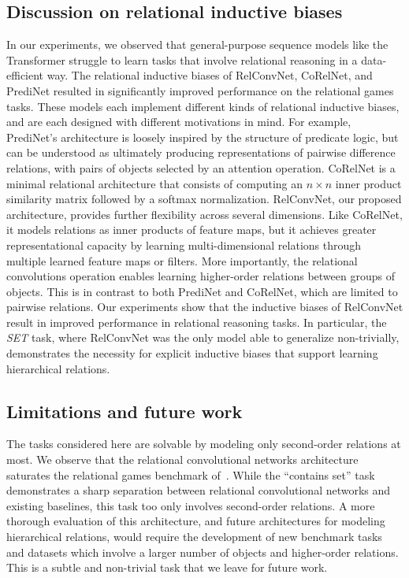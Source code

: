 \subsection*{Discussion on relational inductive biases}
In our experiments, we observed that general-purpose sequence models like the Transformer struggle to learn tasks that involve relational reasoning in a data-efficient way. The relational inductive biases of RelConvNet, CoRelNet, and PrediNet resulted in significantly improved performance on the relational games tasks. These models each implement different kinds of relational inductive biases, and are each designed with different motivations in mind. For example, PrediNet's architecture is loosely inspired by the structure of predicate logic, but can be understood as ultimately producing representations of pairwise difference relations, with pairs of objects selected by an attention operation. CoRelNet is a minimal relational architecture that consists of computing an $n \times n$ inner product similarity matrix followed by a softmax normalization. RelConvNet, our proposed architecture, provides further flexibility across several dimensions. Like CoRelNet, it models relations as inner products of feature maps, but it achieves greater representational capacity by learning multi-dimensional relations through multiple learned feature maps or filters. More importantly, the relational convolutions operation enables learning higher-order relations between groups of objects. This is in contrast to both PrediNet and CoRelNet, which are limited to pairwise relations. Our experiments show that the inductive biases of RelConvNet result in improved performance in relational reasoning tasks. In particular, the \textit{SET} task, where RelConvNet was the only model able to generalize non-trivially, demonstrates the necessity for explicit inductive biases that support learning hierarchical relations.

\subsection*{Limitations and future work}
The tasks considered here are solvable by modeling only second-order relations at most. We observe that the relational convolutional networks architecture saturates the relational games benchmark of~\citet{shanahanExplicitlyRelationalNeural}. While the ``contains set'' task demonstrates a sharp separation between relational convolutional networks and existing baselines, this task too only involves second-order relations.
A more thorough evaluation of this architecture, and future architectures for modeling hierarchical relations, would require the development of new benchmark tasks and datasets which involve a larger number of objects and higher-order relations. This is a subtle and non-trivial task that we leave for future work.

